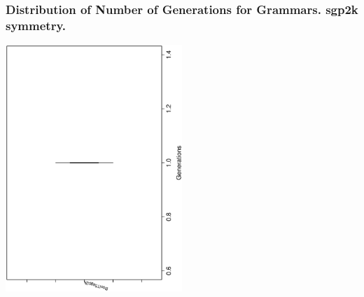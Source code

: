  \begin{frame}
 \frametitle{ Distribution of Number of Generations for Grammars. sgp2k  symmetry. }
 \begin{center}
\includegraphics[width=0.5\textwidth, angle=-90]
{ExpFboxplottGenerations000.eps}
 \end{center}
 \label{ExpFboxplottGenerations000.eps}  
 \end{frame}

